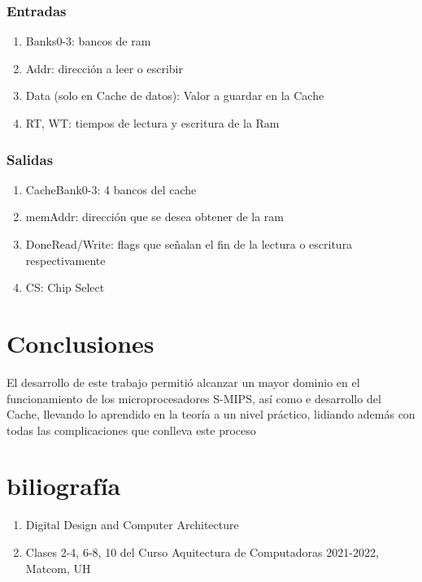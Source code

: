 \documentclass{article}
\begin{document}
                \subsubsection{Entradas}
                \begin{enumerate}
                    \item Banks0-3: bancos de ram 
                    \item Addr: direcci\'on a leer o escribir
                    \item Data (solo en Cache de datos): Valor a guardar en la Cache
                    \item RT, WT: tiempos de lectura y escritura de la Ram
                \end{enumerate}
                \subsubsection{Salidas}
                \begin{enumerate}
                    \item CacheBank0-3: 4 bancos del cache
                    \item memAddr: direcci\'on que se desea obtener de la ram
                    \item DoneRead/Write: flags que se\~nalan el fin de la lectura o escritura respectivamente
                    \item CS: Chip Select
                \end{enumerate}
            \section{Conclusiones}
                El desarrollo de este trabajo permitió alcanzar un mayor dominio en el funcionamiento de los microprocesadores S-MIPS, así como e desarrollo del Cache, llevando lo aprendido en la teoría a un nivel práctico, lidiando además con todas las complicaciones que conlleva este proceso

            \section{biliografía}
                \begin{enumerate}
                 \item Digital Design and Computer Architecture
                 \item Clases 2-4, 6-8, 10 del Curso Aquitectura de Computadoras 2021-2022, Matcom, UH
                \end{enumerate}

        
\end{document}
